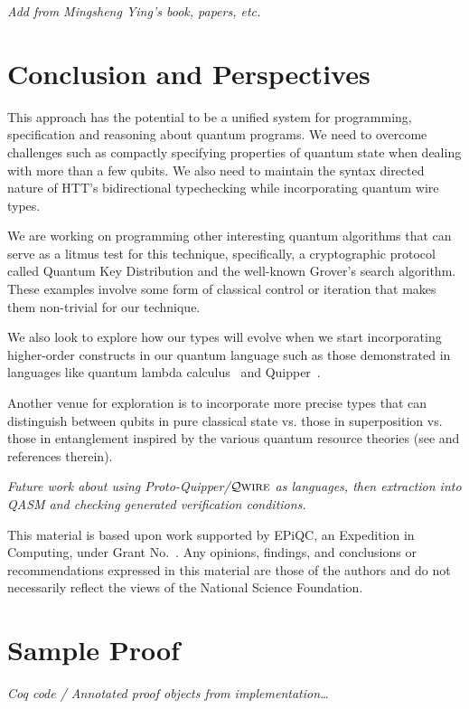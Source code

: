 \documentclass[acmsmall,nonacm,timestamp]{acmart}
\newcommand{\qwire}{\ensuremath{\mathcal{Q}\textsc{wire}}\xspace}
\begin{document}
\textit{Add from Mingsheng Ying's book, papers, etc.}

\section{Conclusion and Perspectives}
This approach has the potential to be a unified system for programming, specification and reasoning about quantum programs. We need to overcome challenges such as compactly specifying properties of quantum state when dealing with more than a few qubits. We also need to maintain the syntax directed nature of HTT's bidirectional typechecking while incorporating quantum wire types.

We are working on programming other interesting quantum algorithms that can serve as a litmus test for this technique, specifically, a cryptographic protocol called Quantum Key Distribution and the well-known Grover's search algorithm. These examples involve some form of classical control or iteration that makes them non-trivial for our technique.

We also look to explore how our types will evolve when we start incorporating higher-order constructs in our quantum language such as those demonstrated in languages like quantum lambda calculus~\cite{selinger_lambda_2006} and Quipper~\cite{green_quipper:_2013}.

Another venue for exploration is to incorporate more precise types that can distinguish between qubits in pure classical state vs. those in superposition vs. those in entanglement inspired by the various quantum resource theories (see \cite{rand_type_2019} and references therein).

\textit{Future work about using Proto-Quipper/\qwire as languages, then extraction into QASM and checking generated verification conditions.}

\begin{acks}

	This material is based upon work supported by
	EPiQC, an 
	Expedition in Computing, under Grant
	No.~.  Any opinions, findings, and
	conclusions or recommendations expressed in this material are those
	of the authors and do not necessarily reflect the views of the
	National Science Foundation.
\end{acks}

\newpage



\newpage

\appendix
\section{Sample Proof}
\textit{Coq code / Annotated proof objects from implementation\ldots}
\end{document}
